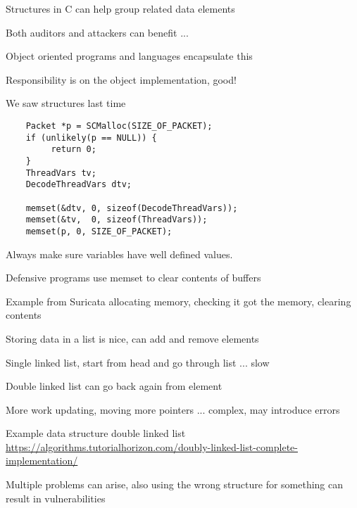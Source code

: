 \documentclass[Screen16to9,17pt]{foils}
\begin{document}


\begin{list2}
\item Structures in C can help group related data elements
\item Both auditors and attackers can benefit ...
\item Object oriented programs and languages encapsulate this
\item Responsibility is on the object implementation, good!
\item We saw structures last time
\end{list2}




\begin{verbatim}
    Packet *p = SCMalloc(SIZE_OF_PACKET);
    if (unlikely(p == NULL)) {
         return 0;
    }
    ThreadVars tv;
    DecodeThreadVars dtv;

    memset(&dtv, 0, sizeof(DecodeThreadVars));
    memset(&tv,  0, sizeof(ThreadVars));
    memset(p, 0, SIZE_OF_PACKET);
\end{verbatim}

\begin{list2}
\item Always make sure variables have well defined values.
\item Defensive programs use memset to clear contents of buffers
\item Example from Suricata allocating memory, checking it got the memory, clearing contents
\end{list2}




\begin{list2}
\item Storing data in a list is nice, can add and remove elements
\item Single linked list, start from head and go through list ... slow
\item Double linked list can go back again from element
\item More work updating, moving more pointers ... complex, may introduce errors
\item Example data structure double linked list\\
\url{https://algorithms.tutorialhorizon.com/doubly-linked-list-complete-implementation/}
\item Multiple problems can arise, also using the wrong structure for something can result in vulnerabilities
\end{list2}
\end{document}

